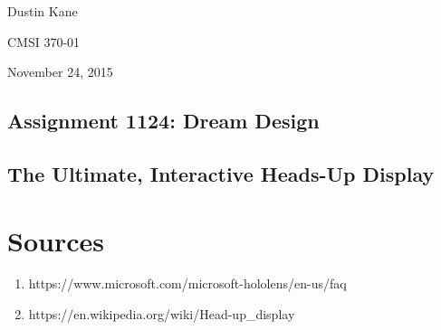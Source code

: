 \documentclass[a4paper,12pt]{article}
\begin{document}
Dustin Kane

CMSI 370-01

November 24, 2015

\begin{center}
\section*{Assignment 1124: Dream Design}
\subsection*{The Ultimate, Interactive Heads-Up Display}
\end{center}

\section{Sources}

\begin{enumerate}
	\item https://www.microsoft.com/microsoft-hololens/en-us/faq
	\item https://en.wikipedia.org/wiki/Head-up\_display
\end{enumerate}
\end{document}

